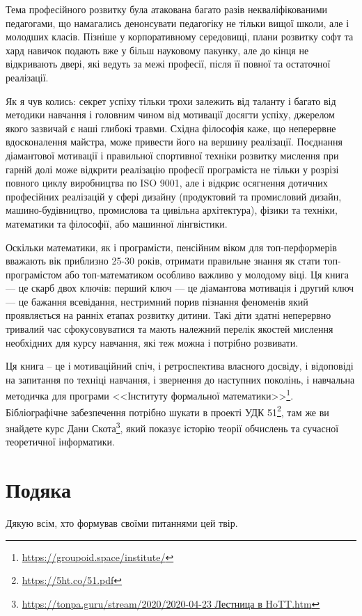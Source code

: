 Тема професійного розвитку була атакована багато разів
некваліфікованими педагогами, що намагались денонсувати
педагогіку не тільки вищої школи, але і молодших класів.
Пізніше у корпоративному середовищі, плани розвитку софт
та хард навичок подають вже у більш науковому пакунку,
але до кінця не відкривають двері, які ведуть за межі
професії, після її повної та остаточної реалізації.

Як я чув колись: секрет успіху тільки трохи залежить
від таланту і багато від методики навчання і головним
чином від мотивації досягти успіху, джерелом якого
зазвичай є наші глибокі травми. Східна філософія каже,
що неперервне вдосконалення майстра, може привести
його на вершину реалізації. Поєднання діамантової
мотивації і правильної спортивної техніки розвитку
мислення при гарній долі може відкрити реалізацію
професії програміста не тільки у розрізі повного
циклу виробництва по ISO 9001, але і відкриє осягнення
дотичних професійних реалізацій у сфері дизайну
(продуктовий та промисловий дизайн, машино-будівництво,
промислова та цивільна архітектура), фізики та техніки,
математики та філософії, або машинної лінгвістики.

Оскільки математики, як і програмісти, пенсійним
віком для топ-перформерів вважають вік приблизно
25-30 років, отримати правильне знання як стати
топ-програмістом або топ-математиком особливо важливо
у молодому віці. Ця книга — це скарб двох ключів:
перший ключ — це діамантова мотивація і другий ключ ---
це бажання всевідання, нестримний порив пізнання
феноменів який проявляється на ранніх етапах
розвитку дитини. Такі діти здатні неперервно
тривалий час сфокусовуватися та мають належний
перелік якостей мислення необхідних для курсу
навчання, які теж можна і потрібно розвивати.

Ця книга -- це і мотиваційний спіч, і ретроспектива
власного досвіду, і відоповіді на запитання по техніці
навчання, і звернення до наступних поколінь, і навчальна
методичка для програми <<Інституту формальної
математики>>\footnote{\url{https://groupoid.space/institute/}}.
Бібліографічне забезпечення потрібно шукати в
проекті УДК 51\footnote{\url{https://5ht.co/51.pdf}},
там же ви знайдете курс Дани
Скота\footnote{\url{https://tonpa.guru/stream/2020/2020-04-23 Лестница в HoTT.htm}},
який показує історію теорії обчислень та сучасної
теоретичної інформатики.

\section*{Подяка}

Дякую всім, хто формував своїми питаннями цей твір.

\normalsize
